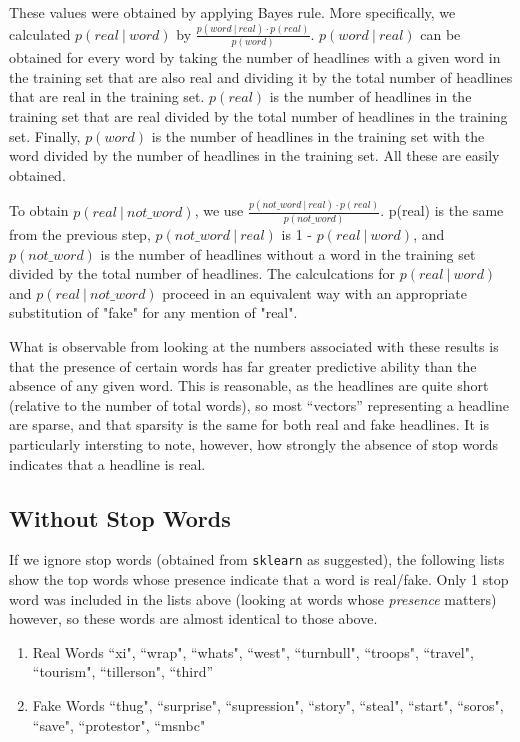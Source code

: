\documentclass{article}
\begin{document}
   These values were obtained by applying Bayes rule. More specifically, we calculated $p(real \ |\ word)$ by
   $ \frac {p(word \ |\ real) \cdot p(real)}{p(word)}$. $p(word \ |\ real)$ can be obtained for every word by taking
   the number of headlines with a given word in the training set that are also real and dividing it by the
   total number of headlines that are real in the training set. $p(real)$ is the number of headlines in the
   training set that are real divided by the total number of headlines in the training set. Finally, $p(word)$ is
   the number of headlines in the training set with the word divided by the number of headlines in the training set.
   All these are easily obtained.

   To obtain $p(real \ |\ not\_word)$, we use $ \frac {p(not\_word \ |\ real) \cdot p(real)}{p(not\_word)}$. p(real)
   is the same from the previous step, $p(not\_word \ |\ real)$ is 1 - $p(real \ |\ word)$, and $p(not\_word)$ is the
   number of headlines without a word in the training  set divided by the total number of headlines.
   The calculcations for $p(real \ |\ word)$ and $p(real \ |\ not\_word)$ proceed in an equivalent way with an
   appropriate substitution of "fake" for any mention of "real".

   What is observable from looking at the numbers associated with these results is that the presence of certain
   words has far greater predictive ability than the absence of any given word. This is reasonable,
   as the headlines are quite short (relative to the number of total words), so most ``vectors'' representing
   a headline are sparse, and that sparsity is the same for both real and fake headlines.
   It is particularly intersting to note, however, how strongly the absence of stop words indicates that a
   headline is real.

   \subsection{Without Stop Words}
   If we ignore stop words (obtained from \texttt{sklearn} as suggested), the following lists show the top words
   whose presence indicate that a word is real/fake. Only 1 stop word was included in the lists above (looking at
   words whose \textit{presence} matters) however, so these words are almost identical to those above.
   \begin{enumerate}
      \item Real Words
         ``xi", ``wrap", ``whats", ``west", ``turnbull", ``troops", ``travel", ``tourism", ``tillerson", ``third'' %
      \item Fake Words
         ``thug", ``surprise", ``supression", ``story", ``steal", ``start", ``soros", ``save", ``protestor", ``msnbc"
   \end{enumerate}
\end{document}
